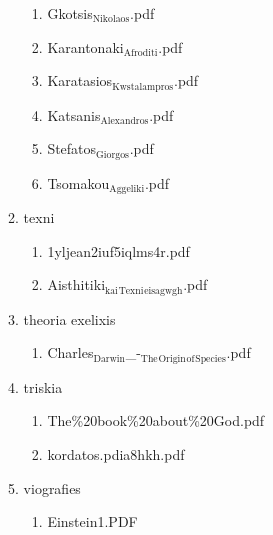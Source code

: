 \documentclass[11pt]{article}
\begin{document}
\begin{enumerate}
\begin{enumerate}
\begin{enumerate}
\item Gkotsis$_{\text{Nikolaos}}$.pdf
\label{sec-1-1-1-1-49-2-2-1-77-4}

\item Karantonaki$_{\text{Afroditi}}$.pdf
\label{sec-1-1-1-1-49-2-2-1-77-5}

\item Karatasios$_{\text{Kwstalampros}}$.pdf
\label{sec-1-1-1-1-49-2-2-1-77-6}

\item Katsanis$_{\text{Alexandros}}$.pdf
\label{sec-1-1-1-1-49-2-2-1-77-7}

\item Stefatos$_{\text{Giorgos}}$.pdf
\label{sec-1-1-1-1-49-2-2-1-77-8}

\item Tsomakou$_{\text{Aggeliki}}$.pdf
\label{sec-1-1-1-1-49-2-2-1-77-9}
\end{enumerate}

\item texni
\label{sec-1-1-1-1-49-2-2-1-78}
\begin{enumerate}
\item 1yljean2iuf5iqlms4r.pdf
\label{sec-1-1-1-1-49-2-2-1-78-1}

\item Aisthitiki$_{\text{kai}}$$_{\text{Texni}}$$_{\text{eisagwgh}}$.pdf
\label{sec-1-1-1-1-49-2-2-1-78-2}
\end{enumerate}

\item theoria exelixis
\label{sec-1-1-1-1-49-2-2-1-79}
\begin{enumerate}
\item Charles$_{\text{Darwin}}$\_-$_{\text{The}}$$_{\text{Origin}}$$_{\text{of}}$$_{\text{Species}}$.pdf
\label{sec-1-1-1-1-49-2-2-1-79-1}
\end{enumerate}

\item triskia
\label{sec-1-1-1-1-49-2-2-1-80}
\begin{enumerate}
\item The\%20book\%20about\%20God.pdf
\label{sec-1-1-1-1-49-2-2-1-80-1}

\item kordatos.pdia8hkh.pdf
\label{sec-1-1-1-1-49-2-2-1-80-2}
\end{enumerate}

\item viografies
\label{sec-1-1-1-1-49-2-2-1-81}
\begin{enumerate}
\item Einstein1.PDF
\label{sec-1-1-1-1-49-2-2-1-81-1}


\end{enumerate}
\end{enumerate}
\end{enumerate}
\end{document}
